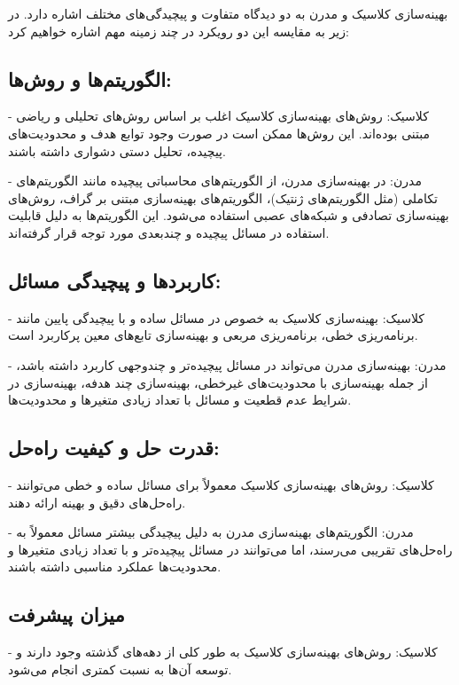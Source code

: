 بهینه‌سازی کلاسیک و مدرن به دو دیدگاه متفاوت و پیچیدگی‌های مختلف اشاره دارد. در زیر به مقایسه این دو رویکرد در چند زمینه مهم اشاره خواهیم کرد:

\subsection{الگوریتم‌ها و روش‌ها:}

- کلاسیک: روش‌های بهینه‌سازی کلاسیک اغلب بر اساس روش‌های تحلیلی و ریاضی مبتنی بوده‌اند. این روش‌ها ممکن است در صورت وجود توابع هدف و محدودیت‌های پیچیده، تحلیل دستی دشواری داشته باشند.

- مدرن: در بهینه‌سازی مدرن، از الگوریتم‌های محاسباتی پیچیده مانند الگوریتم‌های تکاملی (مثل الگوریتم‌های ژنتیک)، الگوریتم‌های بهینه‌سازی مبتنی بر گراف، روش‌های بهینه‌سازی تصادفی و شبکه‌های عصبی استفاده می‌شود. این الگوریتم‌ها به دلیل قابلیت استفاده در مسائل پیچیده و چندبعدی مورد توجه قرار گرفته‌اند.

\subsection{
کاربردها و پیچیدگی مسائل:}
- کلاسیک: بهینه‌سازی کلاسیک به خصوص در مسائل ساده و با ‌پیچیدگی پایین مانند برنامه‌ریزی خطی، برنامه‌ریزی مربعی و بهینه‌سازی تابع‌های معین پرکاربرد است.

- مدرن: بهینه‌سازی مدرن می‌تواند در مسائل پیچیده‌تر و چندوجهی کاربرد داشته باشد، از جمله بهینه‌سازی با محدودیت‌های غیرخطی، بهینه‌سازی چند هدفه، بهینه‌سازی در شرایط عدم قطعیت و مسائل با تعداد زیادی متغیرها و محدودیت‌ها.

\subsection{
قدرت حل و کیفیت راه‌حل:
}

- کلاسیک: روش‌های بهینه‌سازی کلاسیک معمولاً برای مسائل ساده و خطی می‌توانند راه‌حل‌های دقیق و بهینه ارائه دهند.

- مدرن: الگوریتم‌های بهینه‌سازی مدرن به دلیل پیچیدگی بیشتر مسائل معمولاً به راه‌حل‌های تقریبی می‌رسند، اما می‌توانند در مسائل پیچیده‌تر و با تعداد زیادی متغیرها و محدودیت‌ها عملکرد مناسبی داشته باشند.

\subsection{
	میزان پیشرفت
}
- کلاسیک: روش‌های بهینه‌سازی کلاسیک به طور کلی از دهه‌های گذشته وجود دارند و توسعه آن‌ها به نسبت کمتری انجام می‌شود.

